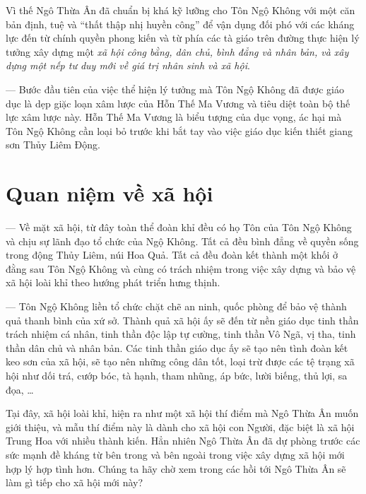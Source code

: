 Vì thế Ngô Thừa Ân đã chuẩn bị khá kỹ lưỡng cho Tôn Ngộ Không với một căn bản định, tuệ và ``thất thập nhị huyền công'' để vận dụng đối phó với các kháng lực đến từ chính quyền phong kiến và từ phía các tà giáo trên đường thực hiện lý tưởng xây dựng một \emph{xã hội công bằng, dân chủ, bình đẳng và nhân bản, và xây dựng một nếp tư duy mới về giá trị nhân sinh và xã hội}.

--- Bước đầu tiên của việc thể hiện lý tưởng mà Tôn Ngộ Không đã được giáo dục là dẹp giặc loạn xâm lược của Hỗn Thế Ma Vương và tiêu diệt toàn bộ thế lực xâm lược này. Hỗn Thế Ma Vương là biểu tượng của dục vọng, ác hại mà Tôn Ngộ Không cần loại bỏ trước khi bắt tay vào việc giáo dục kiến thiết giang sơn Thủy Liêm Động.


\section{Quan niệm về xã hội} %
\label{sec:2_quan_niem_ve_xa_hoi}

--- Về mặt xã hội, từ đây toàn thể đoàn khỉ đều có họ Tôn của Tôn Ngộ Không và chịu sự lãnh đạo tổ chức của Ngộ Không. Tất cả đều bình đẳng về quyền sống trong động Thủy Liêm, núi Hoa Quả. Tất cả đều đoàn kết thành một khối ở đằng sau Tôn Ngộ Không và cùng có trách nhiệm trong việc xây dựng và bảo vệ xã hội loài khỉ theo hướng phát triển hưng thịnh.

--- Tôn Ngộ Không liền tổ chức chặt chẽ an ninh, quốc phòng để bảo vệ thành quả thanh bình của xứ sở. Thành quả xã hội ấy sẽ đến từ nền giáo dục tinh thần trách nhiệm cá nhân, tinh thần độc lập tự cường, tinh thần Vô Ngã, vị tha, tinh thần dân chủ và nhân bản. Các tinh thần giáo dục ấy sẽ tạo nên tình đoàn kết keo sơn của xã hội, sẽ tạo nên những công dân tốt, loại trừ được các tệ trạng xã hội như dối trá, cướp bóc, tà hạnh, tham nhũng, áp bức, lười biếng, thủ lợi, sa đọa, \ldots

Tại đây, xã hội loài khỉ, hiện ra như một xã hội thí điểm mà Ngô Thừa Ân muốn giới thiệu, và mẫu thí điểm này là dành cho xã hội con Người, đặc biệt là xã hội Trung Hoa với nhiều thành kiến. Hẳn nhiên Ngô Thừa Ân đã dự phòng trước các sức mạnh đề kháng từ bên trong và bên ngoài trong việc xây dựng xã hội mới hợp lý hợp tình hơn. Chúng ta hãy chờ xem trong các hồi tới Ngô Thừa Ân sẽ làm gì tiếp cho xã hội mới này?
